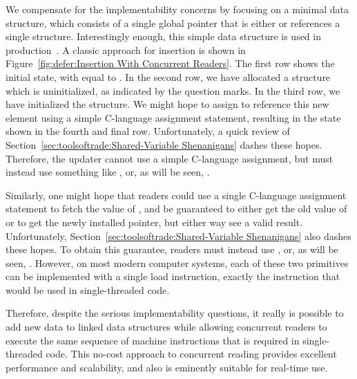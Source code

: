 We compensate for the implementability concerns by focusing on a minimal
data structure, which consists of a single global pointer that is either
 or references a single structure.
Interestingly enough, this simple data structure is used in
production~\cite{GeoffRomer2018C++DeferredReclamationP0561R4}.
A classic approach for insertion is shown in
Figure~\ref{fig:defer:Insertion With Concurrent Readers}.
The first row shows the initial state, with  equal to .
In the second row, we have allocated a structure which is uninitialized,
as indicated by the question marks.
In the third row, we have initialized the structure.
We might hope to assign  to reference this new element
using a simple C-language assignment statement, resulting in the
state shown in the fourth and final row.
Unfortunately, a quick review of
Section~\ref{sec:toolsoftrade:Shared-Variable Shenanigans}
dashes these hopes.
Therefore, the updater cannot use a simple C-language assignment, but
must instead use something like , or, as will be seen,
.

Similarly, one might hope that readers could use a single C-language
assignment statement to fetch the value of , and be guaranteed
to either get the old value of  or to get the newly installed
pointer, but either way see a valid result.
Unfortunately, Section~\ref{sec:toolsoftrade:Shared-Variable Shenanigans}
also dashes these hopes.
To obtain this guarantee, readers must instead use ,
or, as will be seen, .
However, on most modern computer systems, each of these two primitives
can be implemented with a single load instruction, exactly the instruction
that would be used in single-threaded code.

Therefore, despite the serious implementability questions, it really
is possible to add new data to linked data structures while allowing
concurrent readers to execute the same sequence of machine instructions
that is required in single-threaded code.
This no-cost approach to concurrent reading provides excellent performance
and scalability, and also is eminently suitable for real-time use.

